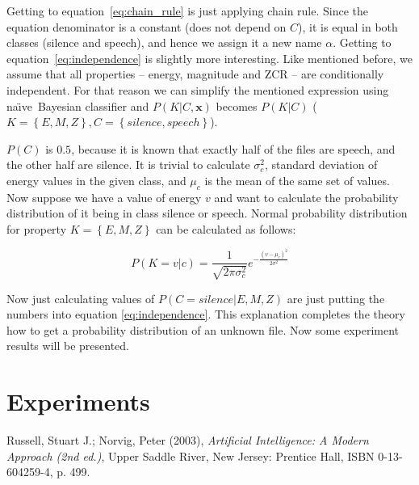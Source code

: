 \documentclass[english,11pt]{article}
\newcommand{\naive}{na\"{\i}ve\ }
\numberwithin{equation}{section}
\begin{document}
Getting to equation~\ref{eq:chain_rule} is just applying chain rule. Since the
equation denominator is a constant (does not depend on $C$), it is equal in
both classes (silence and speech), and hence we assign it a new name $\alpha$.
Getting to equation~\ref{eq:independence} is slightly more interesting. Like
mentioned before, we assume that all properties -- energy, magnitude and ZCR --
are conditionally independent. For that reason we can simplify the mentioned
expression using \naive Bayesian classifier and $P(K | C, \mathbf{x})$ becomes
$P(K|C)$ ($K = \left\{E, M, Z\right\}, C = \left\{ silence, speech \right\}$).

$P(C)$ is $0.5$, because it is known that exactly half of the files are speech,
and the other half are silence. It is trivial to calculate $\sigma_{c}^{2}$,
standard deviation of energy values in the given class, and $\mu_{c}$ is the
mean of the same set of values. Now suppose we have a value of energy $v$ and
want to calculate the probability distribution of it being in class silence or
speech. Normal probability distribution for property $K = \left\{E, M,
Z\right\}$ can be calculated as follows:

$$
P(K = v|c) = \frac{1}{\sqrt{2 \pi \sigma_{c}^{2}}}
e ^{- \frac{ (v - \mu_{c})^2 }{2 \sigma^2} }
$$

Now just calculating values of $P(C=silence| E, M, Z)$ are just putting the
numbers into equation \ref{eq:independence}. This explanation completes the
theory how to get a probability distribution of an unknown file. Now some
experiment results will be presented.

\section{Experiments}

\clearpage
\begin{thebibliography}{9}

        Russell, Stuart J.; Norvig, Peter (2003),
        \emph{Artificial Intelligence: A Modern Approach (2nd ed.)},
        Upper Saddle River, New Jersey: Prentice Hall,
        ISBN 0-13-604259-4, p. 499.

\end{thebibliography}
\end{document}
